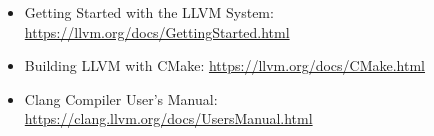 
\begin{itemize}
\item
Getting Started with the LLVM System: \url{https://llvm.org/docs/GettingStarted.html}

\item
Building LLVM with CMake: \url{https://llvm.org/docs/CMake.html}

\item
Clang Compiler User's Manual: \url{https://clang.llvm.org/docs/UsersManual.html}
\end{itemize}

